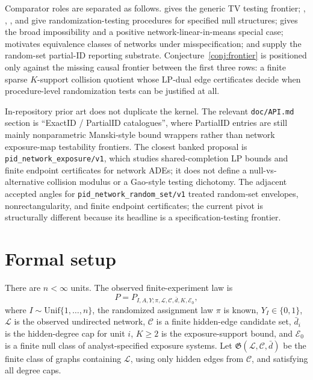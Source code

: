 \documentclass[11pt]{article}
\theoremstyle{definition}
\theoremstyle{plain}
\theoremstyle{remark}
\begin{document}
Comparator roles are separated as follows.  \citet{LeCam1986} gives the generic TV testing frontier; \citet{AtheyEcklesImbens2018}, \citet{BasseFellerToulis2019}, \citet{PuelzBasseFellerToulis2022}, and \citet{HoshinoYanagi2023} give randomization-testing procedures for specified null structures; \citet{GaoHarshawSavjeWang2026} gives the broad impossibility and a positive network-linear-in-means special case; \citet{WeinsteinNevo2026} motivates equivalence classes of networks under misspecification; \citet{BeresteanuMolchanovMolinari2011} and \citet{SchroderOprescuFeuerriegelKallus2026} supply the random-set partial-ID reporting substrate.  Conjecture~\ref{conj:frontier} is positioned only against the missing causal frontier between the first three rows: a finite sparse \(K\)-support collision quotient whose LP-dual edge certificates decide when procedure-level randomization tests can be justified at all.

In-repository prior art does not duplicate the kernel.  The relevant \texttt{doc/API.md} section is ``ExactID / PartialID catalogues'', where PartialID entries are still mainly nonparametric Manski-style bound wrappers rather than network exposure-map testability frontiers.  The closest banked proposal is \texttt{pid\_network\_exposure/v1}, which studies shared-completion LP bounds and finite endpoint certificates for network ADEs; it does not define a null-vs-alternative collision modulus or a Gao-style testing dichotomy.  The adjacent accepted angles for \texttt{pid\_network\_random\_set/v1} treated random-set envelopes, nonrectangularity, and finite endpoint certificates; the current pivot is structurally different because its headline is a specification-testing frontier.

\section{Formal setup}
There are \(n<\infty\) units.  The observed finite-experiment law is
\[
P=P_{I,A,Y;\pi,\mathcal L,\mathcal C,\bar d,K,\mathcal E_0},
\]
where \(I\sim\mathrm{Unif}\{1,\ldots,n\}\), the randomized assignment law \(\pi\) is known, \(Y_I\in\{0,1\}\), \(\mathcal L\) is the observed undirected network, \(\mathcal C\) is a finite hidden-edge candidate set, \(\bar d_i\) is the hidden-degree cap for unit \(i\), \(K\ge2\) is the exposure-support bound, and \(\mathcal E_0\) is a finite null class of analyst-specified exposure systems.  Let \(\mathfrak G(\mathcal L,\mathcal C,\bar d)\) be the finite class of graphs containing \(\mathcal L\), using only hidden edges from \(\mathcal C\), and satisfying all degree caps.
\end{document}
